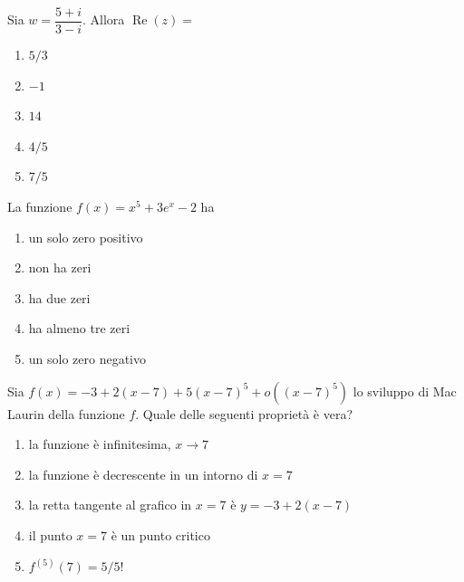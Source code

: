 \begin{quiz}
Sia $w=\dfrac{5+i}{3-i}$. Allora $\operatorname{Re}(z)=$
\begin{enumerate}[label=\alph*),leftmargin=1.3cm,itemsep=3pt,topsep=5pt]
\item $5/3$
\item $-1$
\item $14$
\item $4/5$
\item $7/5$
\end{enumerate}
\end{quiz}

\begin{quiz}
La funzione $f(x)=x^5+3e^x-2$ ha
\begin{enumerate}[label=\alph*),leftmargin=1.3cm,itemsep=3pt,topsep=5pt]
\item un solo zero positivo
\item non ha zeri
\item ha due zeri
\item ha almeno tre zeri
\item un solo zero negativo
\end{enumerate}
\end{quiz}

\begin{quiz}
Sia $f(x)=-3+2(x-7)+5(x-7)^5+o((x-7)^5)$ lo sviluppo di Mac Laurin della funzione $f$. Quale delle seguenti propriet\`a \`e vera?
\begin{enumerate}[label=\alph*),leftmargin=1.3cm,itemsep=3pt,topsep=5pt]
\item la funzione \`e infinitesima, $x\to7$
\item la funzione \`e decrescente in un intorno di $x=7$
\item la retta tangente al grafico in $x=7$ \`e $y=-3+2(x-7)$
\item il punto $x=7$ \`e un punto critico
\item $f^{(5)}(7)=5/5!$
\end{enumerate}
\end{quiz}

